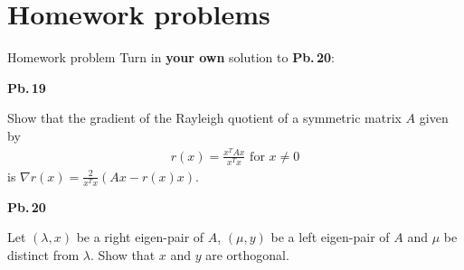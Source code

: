 \documentclass[t,usepdftitle=false]{beamer}
\begin{document}
\section{Homework problems}

\begin{frame}{Homework problem}\vspace{.1cm}
Turn in \textbf{your own} solution to \textbf{Pb.$\,$20}:\vspace{.15cm}\\
\begin{minipage}[t]{0.1\textwidth}
\textbf{Pb.$\,$19}
\end{minipage}
\begin{minipage}[t]{0.89\textwidth}
Show that the gradient of the Rayleigh quotient of a symmetric matrix $A$ given by
\begin{align*}
r(x)=\frac{x^TAx}{x^Tx}\text{ for }x\neq 0
\end{align*}
is $\nabla r(x)=\frac{2}{x^Tx}(Ax-r(x)x)$.
\end{minipage}\vspace{.15cm}
\begin{minipage}[t]{0.1\textwidth}
\textbf{Pb.$\,$20}
\end{minipage}
\begin{minipage}[t]{0.89\textwidth}
Let $(\lambda,x)$ be a right eigen-pair of $A$, $(\mu,y)$ be a left eigen-pair of $A$ and $\mu$ be distinct from $\lambda$. 
Show that $x$ and $y$ are orthogonal.
\end{minipage}\vspace{.15cm}
\end{frame}
\end{document}
